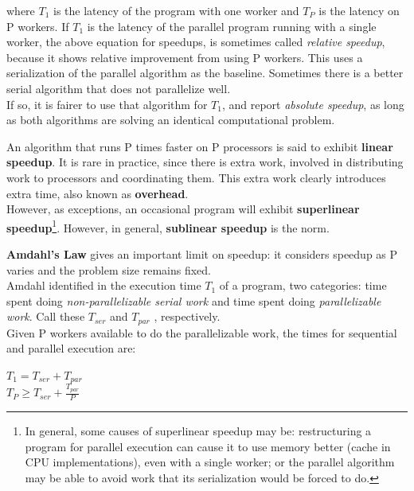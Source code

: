 where \(T_{1}\) is the latency of the program with one worker and \(T_{P}\) is the latency on P workers.
If \(T_{1}\) is the latency of the parallel program running with a single worker, the above equation for speedups, is sometimes called \textit{relative speedup}, because it shows relative improvement from using P workers. This uses a serialization of the parallel algorithm as the baseline. 
Sometimes there is a better serial algorithm that does not parallelize well. \\
If so, it is fairer to use that algorithm for \(T_{1}\), and report \textit{absolute speedup}, as long as both algorithms are solving an identical computational problem. 

An algorithm that runs P times faster on P processors is said to exhibit \textbf{linear speedup}. It is rare in practice, since there is extra work, involved in distributing work to processors and coordinating them. This extra work clearly introduces extra time, also known as \textbf{overhead}.\\
However, as exceptions, an occasional program will exhibit \textbf{superlinear speedup}\footnote{In general, some causes of superlinear speedup may be: restructuring a program for parallel execution can cause it to use memory better (cache in CPU implementations), even with a single worker; or the parallel algorithm  may be able to avoid work that its serialization would be forced to do.}.%
However, in general, \textbf{sublinear speedup} is the norm\cite{structparprog}.

\textbf{Amdahl's Law} gives an important limit on speedup: it considers speedup as P varies and the problem size remains fixed.\\
Amdahl identified in the execution time \(T_{1}\) of a program, two categories: time spent doing \textit{non-parallelizable serial work} and time spent doing \textit{parallelizable work}. Call these \(T_{ser}\) and \(T_{par}\) , respectively. \\
Given P workers available to do the parallelizable work, the times for sequential and parallel execution are:
\begin{center}
	\(T_{1} = T_{ser} + T_{par}\) \\
	\(T_{P} \geq T_{ser} + \frac{T_{par}}{P}\)
\end{center}

